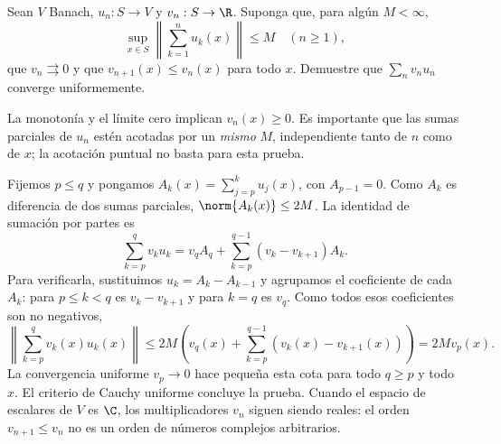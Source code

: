 \begin{ejercicio}\label{ej:lectura-26-7}
Sean $V$ Banach, $u_n:S\to V$ y $v_n:S\to\R$. Suponga que, para algún $M<\infty$,
\[
 \sup_{x\in S}\left\|\sum_{k=1}^nu_k(x)\right\|\le M\quad(n\ge1),
\]
que $v_n\rightrightarrows0$ y que $v_{n+1}(x)\le v_n(x)$ para todo $x$. Demuestre que $\sum_nv_nu_n$ converge uniformemente.
\end{ejercicio}
\begin{solucion}
La monotonía y el límite cero implican $v_n(x)\ge0$. Es importante que las sumas parciales de $u_n$ estén acotadas por un \emph{mismo} $M$, independiente tanto de $n$ como de $x$; la acotación puntual no basta para esta prueba.

Fijemos $p\le q$ y pongamos $A_k(x)=\sum_{j=p}^ku_j(x)$, con $A_{p-1}=0$. Como $A_k$ es diferencia de dos sumas parciales, $\norm{A_k(x)}\le2M$. La identidad de sumación por partes es
\[
 \sum_{k=p}^qv_k u_k
 =v_qA_q+\sum_{k=p}^{q-1}(v_k-v_{k+1})A_k.
\]
Para verificarla, sustituimos $u_k=A_k-A_{k-1}$ y agrupamos el coeficiente de cada $A_k$: para $p\le k<q$ es $v_k-v_{k+1}$ y para $k=q$ es $v_q$. Como todos esos coeficientes son no negativos,
\[
 \left\|\sum_{k=p}^qv_k(x)u_k(x)\right\|
 \le2M\left(v_q(x)+\sum_{k=p}^{q-1}(v_k(x)-v_{k+1}(x))\right)
 =2Mv_p(x).
\]
La convergencia uniforme $v_p\to0$ hace pequeña esta cota para todo $q\ge p$ y todo $x$. El criterio de Cauchy uniforme concluye la prueba. Cuando el espacio de escalares de $V$ es $\C$, los multiplicadores $v_n$ siguen siendo reales: el orden $v_{n+1}\le v_n$ no es un orden de números complejos arbitrarios.
\end{solucion}

